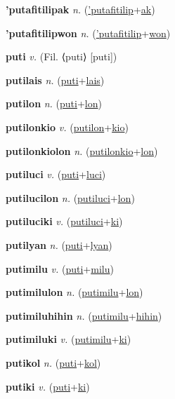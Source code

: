 \textbf{\hypertarget{'putafitilipak}{'putafitilipak}} \textit{n.} (\hyperlink{'putafitilip}{'putafitilip}+\allowbreak \hyperlink{ak}{ak})


\textbf{\hypertarget{'putafitilipwon}{'putafitilipwon}} \textit{n.} (\hyperlink{'putafitilip}{'putafitilip}+\allowbreak \hyperlink{won}{won})


\textbf{\hypertarget{puti}{puti}} \textit{v.} (Fil. ⟨puti⟩ [puti])


\textbf{\hypertarget{putilais}{putilais}} \textit{n.} (\hyperlink{puti}{puti}+\allowbreak \hyperlink{lais}{lais})


\textbf{\hypertarget{putilon}{putilon}} \textit{n.} (\hyperlink{puti}{puti}+\allowbreak \hyperlink{lon}{lon})


\textbf{\hypertarget{putilonkio}{putilonkio}} \textit{v.} (\hyperlink{putilon}{putilon}+\allowbreak \hyperlink{kio}{kio})


\textbf{\hypertarget{putilonkiolon}{putilonkiolon}} \textit{n.} (\hyperlink{putilonkio}{putilonkio}+\allowbreak \hyperlink{lon}{lon})


\textbf{\hypertarget{putiluci}{putiluci}} \textit{v.} (\hyperlink{puti}{puti}+\allowbreak \hyperlink{luci}{luci})


\textbf{\hypertarget{putilucilon}{putilucilon}} \textit{n.} (\hyperlink{putiluci}{putiluci}+\allowbreak \hyperlink{lon}{lon})


\textbf{\hypertarget{putiluciki}{putiluciki}} \textit{v.} (\hyperlink{putiluci}{putiluci}+\allowbreak \hyperlink{ki}{ki})


\textbf{\hypertarget{putilyan}{putilyan}} \textit{n.} (\hyperlink{puti}{puti}+\allowbreak \hyperlink{lyan}{lyan})


\textbf{\hypertarget{putimilu}{putimilu}} \textit{v.} (\hyperlink{puti}{puti}+\allowbreak \hyperlink{milu}{milu})


\textbf{\hypertarget{putimilulon}{putimilulon}} \textit{n.} (\hyperlink{putimilu}{putimilu}+\allowbreak \hyperlink{lon}{lon})


\textbf{\hypertarget{putimiluhihin}{putimiluhihin}} \textit{n.} (\hyperlink{putimilu}{putimilu}+\allowbreak \hyperlink{hihin}{hihin})


\textbf{\hypertarget{putimiluki}{putimiluki}} \textit{v.} (\hyperlink{putimilu}{putimilu}+\allowbreak \hyperlink{ki}{ki})


\textbf{\hypertarget{putikol}{putikol}} \textit{n.} (\hyperlink{puti}{puti}+\allowbreak \hyperlink{kol}{kol})


\textbf{\hypertarget{putiki}{putiki}} \textit{v.} (\hyperlink{puti}{puti}+\allowbreak \hyperlink{ki}{ki})


